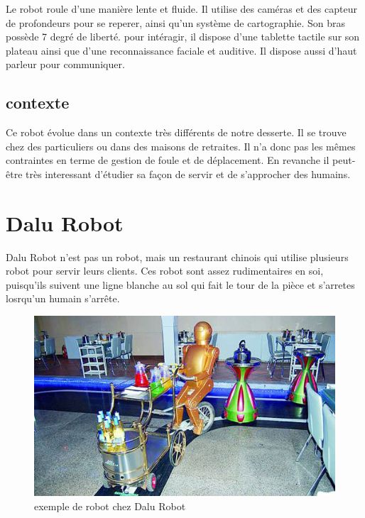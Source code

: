 Le robot roule d'une manière lente et fluide. Il utilise des caméras et des capteur de profondeurs pour se reperer, ainsi qu'un système de cartographie. Son bras possède 7 degré de liberté. pour intéragir, il dispose d'une tablette tactile sur son plateau ainsi que d'une reconnaissance faciale et auditive. Il dispose aussi d'haut parleur pour communiquer.

\subsection{contexte}

Ce robot évolue dans un contexte très différents de notre desserte. Il se trouve chez des particuliers ou dans des maisons de retraites. Il n'a donc pas les mêmes contraintes en terme de gestion de foule et de déplacement. En revanche il peut-être très interessant d'étudier sa façon de servir et de s'approcher des humains.

\newpage

\section{Dalu Robot}

Dalu Robot n'est pas un robot, mais un restaurant chinois qui utilise plusieurs robot pour servir leurs clients. Ces robot sont assez rudimentaires en soi, puisqu'ils suivent une ligne blanche au sol qui fait le tour de la pièce et s'arretes losrqu'un humain s'arrête.

\begin{figure}[h]
\begin{center}
\includegraphics[scale=0.55]{Images/dalu-robot-1.jpg}
\caption{exemple de robot chez Dalu Robot}
\label{exemple de robot chez Dalu Robot}
\end{center}
\end{figure}

